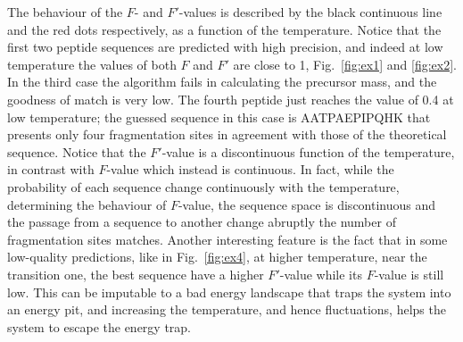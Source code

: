 The behaviour of the $F$- and $F'$-values is described by the black continuous
line and the red dots respectively, as
a function of the temperature.
Notice that the first two peptide sequences are predicted with high precision,
and indeed at low temperature the values of both $F$ and $F'$ are close to 1,
Fig.~\ref{fig:ex1} and \ref{fig:ex2}.
In the third case the algorithm fails in calculating the precursor mass, and the
goodness of match is very low.
The fourth peptide just reaches the value of 0.4 at low temperature; the
guessed sequence in this case is AATPAEPIPQHK that presents only
four fragmentation sites in agreement with those of the theoretical sequence.
Notice that the $F'$-value is a discontinuous function of the temperature, in
contrast with $F$-value which instead is continuous.
In fact, while the probability of each sequence change continuously with the
temperature, determining the behaviour of $F$-value, the sequence space is
discontinuous and the passage from a sequence to another change abruptly the
number of fragmentation sites matches.
Another interesting feature is the fact that in some low-quality predictions,
like in Fig.~\ref{fig:ex4}, at
higher temperature, near the transition one, the best sequence have a higher
$F'$-value while its $F$-value is still low. This can be imputable to a bad
energy landscape that traps the system into an energy pit, and increasing
the temperature, and hence fluctuations, helps the system to escape the energy trap.


%


